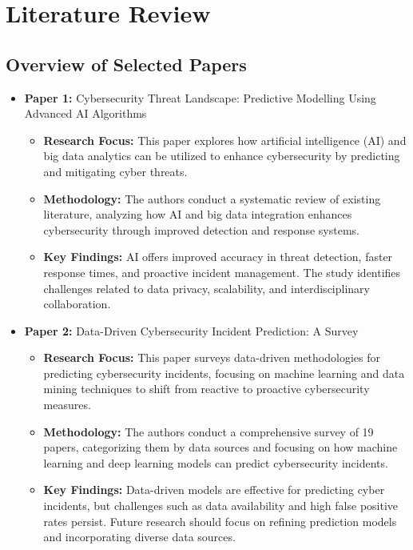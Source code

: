 \documentclass[12pt,a4paper]{article}
\begin{document}
\section{Literature Review}

\subsection{Overview of Selected Papers}
\begin{itemize}
    \item \textbf{Paper 1:} Cybersecurity Threat Landscape: Predictive Modelling Using Advanced AI Algorithms \cite{Maddireddy2022}
    \begin{itemize}
        \item \textbf{Research Focus:} This paper explores how artificial intelligence (AI) and big data analytics can be utilized to enhance cybersecurity by predicting and mitigating cyber threats.
        \item \textbf{Methodology:} The authors conduct a systematic review of existing literature, analyzing how AI and big data integration enhances cybersecurity through improved detection and response systems.
        \item \textbf{Key Findings:} AI offers improved accuracy in threat detection, faster response times, and proactive incident management. The study identifies challenges related to data privacy, scalability, and interdisciplinary collaboration.
    \end{itemize}
    \vspace{0.2cm}
    \item \textbf{Paper 2:} Data-Driven Cybersecurity Incident Prediction: A Survey \cite{Sun2019}
    \begin{itemize}
        \item \textbf{Research Focus:} This paper surveys data-driven methodologies for predicting cybersecurity incidents, focusing on machine learning and data mining techniques to shift from reactive to proactive cybersecurity measures.
        \item \textbf{Methodology:} The authors conduct a comprehensive survey of 19 papers, categorizing them by data sources and focusing on how machine learning and deep learning models can predict cybersecurity incidents.
        \item \textbf{Key Findings:} Data-driven models are effective for predicting cyber incidents, but challenges such as data availability and high false positive rates persist. Future research should focus on refining prediction models and incorporating diverse data sources.

\end{itemize}
\end{itemize}
\end{document}
